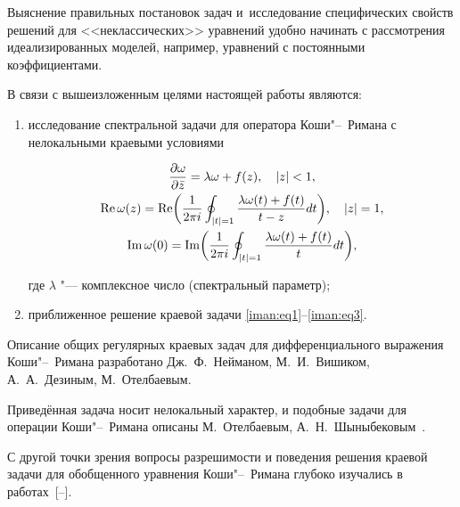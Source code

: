 Выяснение правильных постановок задач и~исследование специфических свойств решений для <<неклассических>> уравнений удобно начинать с рассмотрения идеализированных моделей, например, уравнений с постоянными коэффициентами.



В связи с вышеизложенным целями настоящей работы являются:

\begin{enumerate}

\item исследование спектральной задачи для оператора Коши"--~Римана с не\-локальными краевыми условиями

\begin{gather}

\label{iman:eq1}

\frac{\partial \omega }{\partial \bar z} = \lambda \omega  + f(z),  \quad |z| < 1,\\

\label{iman:eq3}

\mathop{\rm Re}\omega (z) = \mathop{\rm Re} \biggl(\frac{1}{2\pi i} \oint_{|t| = 1} \frac{\lambda \omega (t) + f(t)}{t - z}dt \biggr),  \quad |z| = 1,\\

\label{iman:eq3}

\mathop{\rm Im} \omega (0) = \mathop{\rm Im} \biggl(\frac{1}{2\pi i} \oint_{|t| =1} \frac{\lambda \omega (t)+f(t)}{t}dt\biggr),

\end{gather}

где $\lambda$ "--- комплексное число (спектральный параметр);



\item приближенное решение краевой задачи \eqref{iman:eq1}--\eqref{iman:eq3}.



\end{enumerate}



Описание общих регулярных краевых задач для дифференциального выражения Коши"--~Римана разработано Дж.~Ф.~Нейманом, М.~И.~Вишиком, А.~А.~Дезиным, М.~Отелбаевым. 

Приведённая задача носит нелокальный характер, и подобные задачи для операции Коши"--~Римана описаны  М.~Отелбаевым, А.~Н.~Шыныбековым~\cite{iman:bib5}.



С другой точки зрения вопросы разрешимости и поведения решения краевой задачи для обобщенного уравнения Коши"--~Римана глубоко изучались в работах~[--]. 

